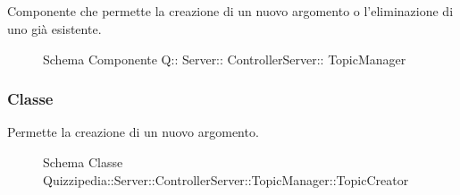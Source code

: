 \subsection{}
Componente che permette la creazione di un nuovo argomento o l'eliminazione di uno già esistente.
\begin{figure}[H]
\centering
\noindent{}
\caption[Schema Componente Quizzipedia::Server::ControllerServer::TopicManager]{Schema Componente Q:: Server:: ControllerServer:: TopicManager}
\end{figure}
\subsubsection{Classe }
Permette la creazione di un nuovo argomento.
\begin{figure}[H]
\centering
\noindent{}
\caption[Schema Classe TopicCreator]{Schema Classe Quizzipedia::Server::ControllerServer::TopicManager::TopicCreator}
\end{figure}
